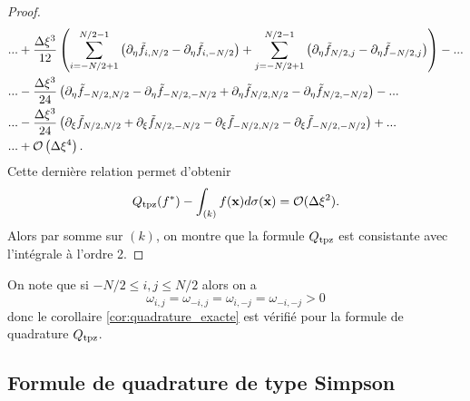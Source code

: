 \begin{proof}
\begin{align*}
& ... + \dfrac{\Delta \xi^3}{12} \left( \displaystyle\sum\limits_{i=-N/2+1}^{N/2-1} \left( \partial_{\eta}\tilde{f}_{i, N/2} - \partial_{\eta}\tilde{f}_{i, -N/2} \right) + \displaystyle\sum\limits_{j=-N/2+1}^{N/2-1} \left( \partial_{\eta}\tilde{f}_{N/2,j} - \partial_{\eta}\tilde{f}_{-N/2,j} \right) \right) - ...  \\
	&  ... - \dfrac{\Delta \xi^3}{24} \left( \partial_{\eta}\tilde{f}_{-N/2,N/2} - \partial_{\eta}\tilde{f}_{-N/2,-N/2} + \partial_{\eta}\tilde{f}_{N/2,N/2}  - \partial_{\eta}\tilde{f}_{N/2,-N/2} \right) - ...  \\
& ... - \dfrac{\Delta \xi^3}{24} \left( \partial_{\xi}\tilde{f}_{N/2,N/2} + \partial_{\xi}\tilde{f}_{N/2,-N/2} - \partial_{\xi}\tilde{f}_{-N/2,N/2}  - \partial_{\xi}\tilde{f}_{-N/2,-N/2} \right)+...\\
& ... + \mathcal{O} \left( \Delta \xi^4 \right).
\end{align*}
Cette dernière relation permet d'obtenir
\begin{equation}
Q_{\text{tpz}}(f^*) - \displaystyle\int_{(k)} f(\mathbf{x})d\sigma(\mathbf{x}) = \mathcal{O}(\Delta \xi^2).
\end{equation}
Alors par somme sur $(k)$, on montre que la formule $Q_{\text{tpz}}$ est consistante avec l'intégrale à l'ordre 2.
\end{proof}


\begin{remarque}
On note que si $-N/2 \leq i,j \leq N/2$ alors on a 
\begin{equation}
\omega_{i,j} = \omega_{-i,j} = \omega_{i,-j} = \omega_{-i,-j} > 0
\end{equation}
donc le corollaire \ref{cor:quadrature_exacte} est vérifié pour la formule de quadrature $Q_{\text{tpz}}$.
\end{remarque}



























\subsection{Formule de quadrature de type Simpson}

